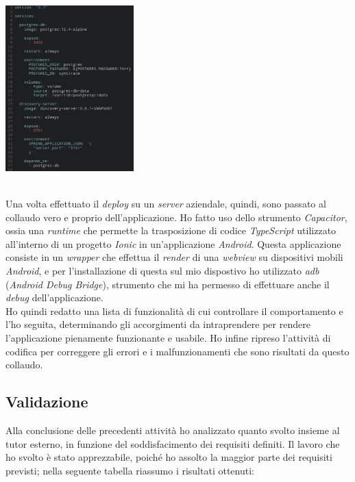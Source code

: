 \begin{minipage}{\linewidth}
  \centering
    \includegraphics[height=6.4cm]{immagini/dockeryml}
\end{minipage} \\

Una volta effettuato il \textit{deploy} su un \textit{server} aziendale, quindi, sono passato al collaudo vero e proprio dell'applicazione. Ho fatto uso dello strumento \textit{Capacitor}, ossia una \textit{runtime} che permette la trasposizione di codice \textit{TypeScript} utilizzato all'interno di un progetto \textit{Ionic} in un'applicazione \textit{Android}. Questa applicazione consiste in un \textit{wrapper} che effettua il \textit{render} di una \textit{webview} su dispositivi mobili \textit{Android}, e per l'installazione di questa sul mio dispostivo ho utilizzato \textit{adb} (\textit{Android Debug Bridge}), strumento che mi ha permesso di effettuare anche il \textit{debug} dell'applicazione. \\
Ho quindi redatto una lista di funzionalità di cui controllare il comportamento e l'ho seguita, determinando gli accorgimenti da intraprendere per rendere l'applicazione pienamente funzionante e usabile. Ho infine ripreso l'attività di codifica per correggere gli errori e i malfunzionamenti che sono risultati da questo collaudo.

\subsection*{Validazione}

Alla conclusione delle precedenti attività ho analizzato quanto svolto insieme al tutor esterno, in funzione del soddisfacimento dei requisiti definiti. Il lavoro che ho svolto è stato apprezzabile, poiché ho assolto la maggior parte dei requisiti previsti; nella seguente tabella riassumo i risultati ottenuti:

